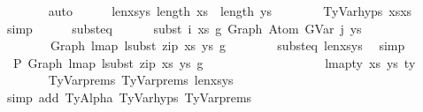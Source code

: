 \begin{isabellebody}
\ \ \ \ \ \ \isamarkupfalse%
\ auto\isanewline
\isanewline
\ \ \ \ \isamarkupfalse%
\ len{\isacharunderscore}{\kern0pt}xs{\isacharunderscore}{\kern0pt}ys{\isacharcolon}{\kern0pt}\ {\isachardoublequoteopen}length\ xs\ {\isacharequal}{\kern0pt}\ length\ ys{\isachardoublequoteclose}\isanewline
\ \ \ \ \ \ \isamarkupfalse%
\ TyVar{\isachardot}{\kern0pt}hyps{\isacharparenleft}{\kern0pt}{}{\isacharparenright}{\kern0pt}\ xs{\isacharprime}{\kern0pt}{\isacharunderscore}{\kern0pt}xs\ \isamarkupfalse%
\ simp\isanewline
\isanewline
\ \ \ \ \isamarkupfalse%
\ subst{\isacharunderscore}{\kern0pt}eq{\isacharprime}{\kern0pt}{\isacharcolon}{\kern0pt}\isanewline
\ \ \ \ \ \ {\isachardoublequoteopen}subst\ i\ xs\ g{}\ {\isacharparenleft}{\kern0pt}Graph\ {\isacharparenleft}{\kern0pt}Atom\ {\isacharparenleft}{\kern0pt}GVar\ j{\isacharparenright}{\kern0pt}\ ys{\isacharparenright}{\kern0pt}{\isacharparenright}{\kern0pt}\isanewline
\ \ \ \ \ \ \ {\isacharequal}{\kern0pt}\ Graph\ {\isacharparenleft}{\kern0pt}lmap\ {\isacharparenleft}{\kern0pt}lsubst\ {\isacharparenleft}{\kern0pt}zip\ xs\ ys{\isacharparenright}{\kern0pt}{\isacharparenright}{\kern0pt}\ g{}{\isacharparenright}{\kern0pt}{\isachardoublequoteclose}\isanewline
\ \ \ \ \ \ \isamarkupfalse%
\ subst{\isacharunderscore}{\kern0pt}eq\ len{\isacharunderscore}{\kern0pt}xs{\isacharunderscore}{\kern0pt}ys\ \isamarkupfalse%
\ simp\isanewline
\isanewline
\ \ \ \ \isamarkupfalse%
\ {\isachardoublequoteopen}{\isasymGamma}{}\ {\isasymturnstile}{\isacharbraceleft}{\kern0pt}P{\isacharbraceright}{\kern0pt}\ Graph\ {\isacharparenleft}{\kern0pt}lmap\ {\isacharparenleft}{\kern0pt}lsubst\ {\isacharparenleft}{\kern0pt}zip\ xs\ ys{\isacharparenright}{\kern0pt}{\isacharparenright}{\kern0pt}\ g{}{\isacharparenright}{\kern0pt}\isanewline
\ \ \ \ \ \ \ \ \ \ \ \ \ \ \ \ \ \ {\isacharcolon}{\kern0pt}\ lmap{\isacharunderscore}{\kern0pt}ty\ xs\ ys\ ty{}{\isachardoublequoteclose}\isanewline
\ \ \ \ \ \ \isamarkupfalse%
\ TyVar{\isachardot}{\kern0pt}prems{\isacharparenleft}{\kern0pt}{}{\isacharparenright}{\kern0pt}\ TyVar{\isachardot}{\kern0pt}prems{\isacharparenleft}{\kern0pt}{}{\isacharparenright}{\kern0pt}\ len{\isacharunderscore}{\kern0pt}xs{\isacharunderscore}{\kern0pt}ys\isanewline
\ \ \ \ \ \ \isamarkupfalse%
\ {\isacharparenleft}{\kern0pt}simp\ add{\isacharcolon}{\kern0pt}\ TyAlpha\ TyVar{\isachardot}{\kern0pt}hyps{\isacharparenleft}{\kern0pt}{}{\isacharparenright}{\kern0pt}\ TyVar{\isachardot}{\kern0pt}prems{\isacharparenleft}{\kern0pt}{}{\isacharcomma}{\kern0pt}{}{\isacharparenright}{\kern0pt}{\isacharparenright}{\kern0pt}\isanewline

\end{isabellebody}
